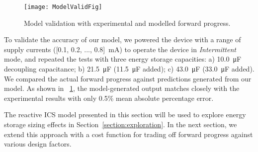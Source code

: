 
\begin{figure}[!t]
	\centering
	\texttt{[image: ModelValidFig]} %
	\caption{Model validation with experimental and modelled forward progress. }
	\label{fig:modelvalid}
\end{figure}

To validate the accuracy of our model, we powered the device with a range of supply currents ([0.1, 0.2, ..., 0.8]\SI{}{\milli\ampere}) to operate the device in \textit{Intermittent} mode, and repeated the tests with three energy storage capacities: a) \SI{10.0}{\micro\farad} decoupling capacitance; b) \SI{21.5}{\micro\farad} (\SI{11.5}{\micro\farad} added); c) \SI{43.0}{\micro\farad} (\SI{33.0}{\micro\farad} added). We compared the actual forward progress against predictions generated from our model. As shown in \figurename{~\ref{fig:modelvalid}}, the model-generated output matches closely with the experimental results with only 0.5\% mean absolute percentage error. 






The reactive ICS model presented in this section will be used to explore energy storage sizing effects in Section~\ref{section:exploration}. In the next section, we extend this approach with a cost function for trading off forward progress against various design factors. 